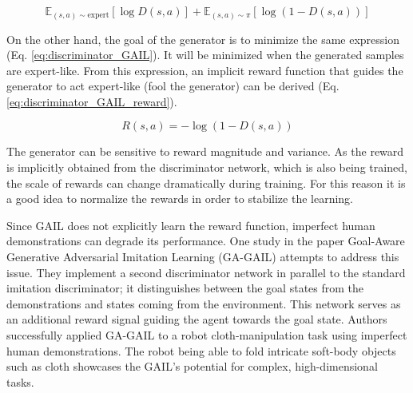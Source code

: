 \begin{equation}
\mathbb{E}_{(s,a) \sim \text{expert}}[\log D(s,a)] + \mathbb{E}_{(s,a) \sim \pi}[\log (1 - D(s,a))]
\label{eq:discriminator_GAIL}
\end{equation}

\bigskip \noindent
On the other hand, the goal of the generator is to minimize the same expression (Eq. \ref{eq:discriminator_GAIL}). It will be minimized when the generated samples are expert-like. From this expression, an implicit reward function that guides the generator to act expert-like (fool the generator) can be derived (Eq. \ref{eq:discriminator_GAIL_reward}).

\begin{equation}
R(s,a) = -\log (1 - D(s,a))
\label{eq:discriminator_GAIL_reward}
\end{equation}

\bigskip \noindent
The generator can be sensitive to reward magnitude and variance. As the reward is implicitly obtained from the discriminator network, which is also being trained, the scale of rewards can change dramatically during training. For this reason it is a good idea to normalize the rewards in order to stabilize the learning.

\bigskip \noindent
Since GAIL does not explicitly learn the reward function, imperfect human demonstrations can degrade its performance. One study in the paper Goal-Aware Generative Adversarial Imitation Learning (GA-GAIL) \cite{tsurumine2022goalawaregenerativeadversarialimitation} attempts to address this issue. They implement a second discriminator network in parallel to the standard imitation discriminator; it distinguishes between the goal states from the demonstrations and states coming from the environment. This network serves as an additional reward signal guiding the agent towards the goal state. Authors successfully applied GA-GAIL to a robot cloth-manipulation task using imperfect human demonstrations. The robot being able to fold intricate soft-body objects such as cloth showcases the GAIL's potential for complex, high-dimensional tasks.